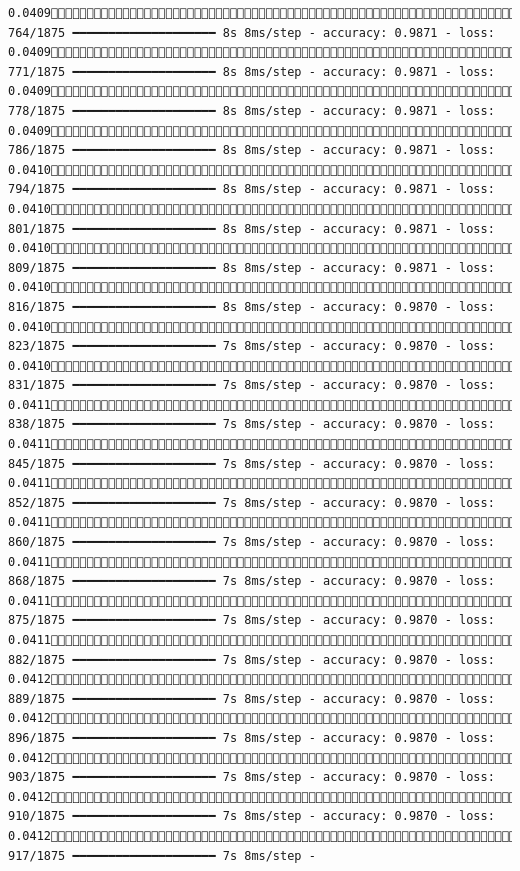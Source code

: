 \documentclass[
  letterpaper,
  DIV=11,
  numbers=noendperiod]{scrreprt}
\begin{document}
\begin{verbatim}
0.0409 764/1875 ━━━━━━━━━━━━━━━━━━━━ 8s 8ms/step - accuracy: 0.9871 - loss: 0.0409 771/1875 ━━━━━━━━━━━━━━━━━━━━ 8s 8ms/step - accuracy: 0.9871 - loss: 0.0409 778/1875 ━━━━━━━━━━━━━━━━━━━━ 8s 8ms/step - accuracy: 0.9871 - loss: 0.0409 786/1875 ━━━━━━━━━━━━━━━━━━━━ 8s 8ms/step - accuracy: 0.9871 - loss: 0.0410 794/1875 ━━━━━━━━━━━━━━━━━━━━ 8s 8ms/step - accuracy: 0.9871 - loss: 0.0410 801/1875 ━━━━━━━━━━━━━━━━━━━━ 8s 8ms/step - accuracy: 0.9871 - loss: 0.0410 809/1875 ━━━━━━━━━━━━━━━━━━━━ 8s 8ms/step - accuracy: 0.9871 - loss: 0.0410 816/1875 ━━━━━━━━━━━━━━━━━━━━ 8s 8ms/step - accuracy: 0.9870 - loss: 0.0410 823/1875 ━━━━━━━━━━━━━━━━━━━━ 7s 8ms/step - accuracy: 0.9870 - loss: 0.0410 831/1875 ━━━━━━━━━━━━━━━━━━━━ 7s 8ms/step - accuracy: 0.9870 - loss: 0.0411 838/1875 ━━━━━━━━━━━━━━━━━━━━ 7s 8ms/step - accuracy: 0.9870 - loss: 0.0411 845/1875 ━━━━━━━━━━━━━━━━━━━━ 7s 8ms/step - accuracy: 0.9870 - loss: 0.0411 852/1875 ━━━━━━━━━━━━━━━━━━━━ 7s 8ms/step - accuracy: 0.9870 - loss: 0.0411 860/1875 ━━━━━━━━━━━━━━━━━━━━ 7s 8ms/step - accuracy: 0.9870 - loss: 0.0411 868/1875 ━━━━━━━━━━━━━━━━━━━━ 7s 8ms/step - accuracy: 0.9870 - loss: 0.0411 875/1875 ━━━━━━━━━━━━━━━━━━━━ 7s 8ms/step - accuracy: 0.9870 - loss: 0.0411 882/1875 ━━━━━━━━━━━━━━━━━━━━ 7s 8ms/step - accuracy: 0.9870 - loss: 0.0412 889/1875 ━━━━━━━━━━━━━━━━━━━━ 7s 8ms/step - accuracy: 0.9870 - loss: 0.0412 896/1875 ━━━━━━━━━━━━━━━━━━━━ 7s 8ms/step - accuracy: 0.9870 - loss: 0.0412 903/1875 ━━━━━━━━━━━━━━━━━━━━ 7s 8ms/step - accuracy: 0.9870 - loss: 0.0412 910/1875 ━━━━━━━━━━━━━━━━━━━━ 7s 8ms/step - accuracy: 0.9870 - loss: 0.0412 917/1875 ━━━━━━━━━━━━━━━━━━━━ 7s 8ms/step - 
\end{verbatim}
\end{document}
